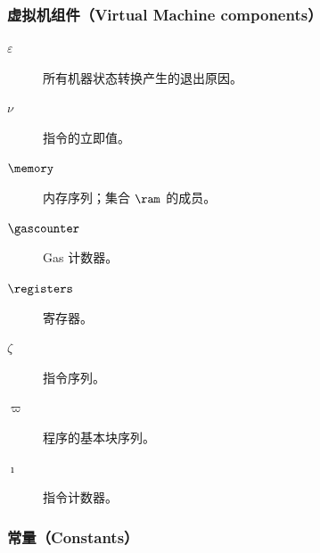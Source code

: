 \subsubsection{虚拟机组件（Virtual Machine components）}

\begin{description}
  \item[$\varepsilon$] 所有机器状态转换产生的退出原因。
  \item[$\nu$] 指令的立即值。
  \item[$\memory$] 内存序列；集合 $\ram$ 的成员。
  \item[$\gascounter$] Gas 计数器。
  \item[$\registers$] 寄存器。
  \item[$\zeta$] 指令序列。
  \item[$\varpi$] 程序的基本块序列。
  \item[$\imath$] 指令计数器。
\end{description}

\subsubsection{常量（Constants）}

